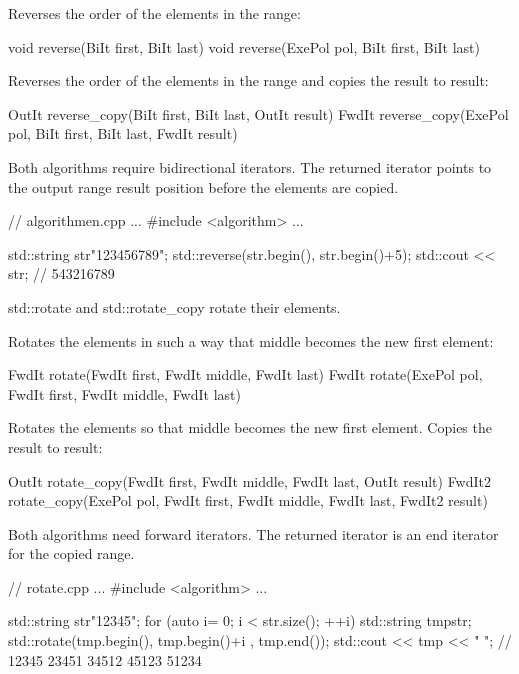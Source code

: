 Reverses the order of the elements in the range:

\begin{cpp}
void reverse(BiIt first, BiIt last)
void reverse(ExePol pol, BiIt first, BiIt last)
\end{cpp}

Reverses the order of the elements in the range and copies the result to result:

\begin{cpp}
OutIt reverse_copy(BiIt first, BiIt last, OutIt result)
FwdIt reverse_copy(ExePol pol, BiIt first, BiIt last, FwdIt result)
\end{cpp}

Both algorithms require bidirectional iterators. The returned iterator points to the output range result position before the elements are copied.


\begin{cpp}
// algorithmen.cpp
...
#include <algorithm>
...

std::string str{"123456789"};
std::reverse(str.begin(), str.begin()+5);
std::cout << str; // 543216789
\end{cpp}


std::rotate and std::rotate\_copy rotate their elements.

Rotates the elements in such a way that middle becomes the new first element:

\begin{cpp}
FwdIt rotate(FwdIt first, FwdIt middle, FwdIt last)
FwdIt rotate(ExePol pol, FwdIt first, FwdIt middle, FwdIt last)
\end{cpp}

Rotates the elements so that middle becomes the new first element. Copies the result to result:

\begin{cpp}
OutIt rotate_copy(FwdIt first, FwdIt middle, FwdIt last, OutIt result)
FwdIt2 rotate_copy(ExePol pol, FwdIt first, FwdIt middle, FwdIt last,
				   FwdIt2 result)
\end{cpp}

Both algorithms need forward iterators. The returned iterator is an end iterator for the copied range.


\begin{cpp}
// rotate.cpp
...
#include <algorithm>
...

std::string str{"12345"};
for (auto i= 0; i < str.size(); ++i){
	std::string tmp{str};
	std::rotate(tmp.begin(), tmp.begin()+i , tmp.end());
	std::cout << tmp << " ";
} // 12345 23451 34512 45123 51234
\end{cpp}

